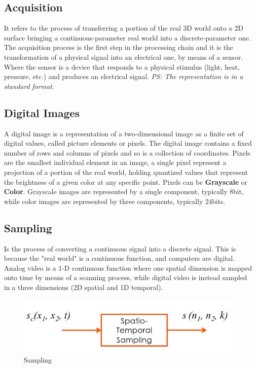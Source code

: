 \subsection{Acquisition}
It refers to the process of transferring a portion of the real 3D world onto a 2D surface bringing a continuous-parameter real world into a discrete-parameter one. 
The acquisition process is the first step in the processing chain and it is the transformation of a physical signal into an electrical one, by means of a sensor. 
Where the sensor is a device that responds to a physical stimulus (light, heat, pressure, etc.) and produces an electrical signal. 
\textit{PS: The representation is in a standard format.}
\\
\subsection{Digital Images}
A digital image is a representation of a two-dimensional image as a finite set of digital values, called picture elements or pixels. 
The digital image contains a fixed number of rows and columns of pixels and so is a collection of coordinates. Pixels are the smallest individual element in an image, a single pixel represent a projection of a portion of the real world, holding quantized values that represent the brightness of a given color at any specific point. Pixels can be \textbf{Grayscale} or \textbf{Color}. 
Grayscale images are represented by a single component, typically 8bit, while color images are represented by three components, typically 24bits.
\\
\subsection{Sampling}
Is the process of converting a continuous signal into a discrete signal. This is because the "real world" is a continuous function, and computers are digital. Analog video is a 1-D continuous function where one spatial dimension is mapped onto time by means of a scanning process, while digital video is instead sampled in a three dimensions (2D spatial and 1D temporal).
\\
\begin{figure}[h]
    \centering
    \includegraphics[scale=0.5]{Figures/Sampling.png}
    \caption{Sampling}
    \label{fig:enter-label}
\end{figure}

